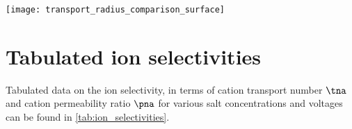 %
\begin{figure*}[t]
  \centering
  \texttt{[image: transport\_radius\_comparison\_surface]}

  \caption[\textit{Lumen} diameters of {ClyA}.]%
  {%
    \textbf{\textit{Lumen} diameters of {ClyA}.}
    Side and top view of the molecular surface of the \gls{clya-as} equilibrated with \gls{md} (left), with
    the crystal ~\cite{Mueller-2009} (middle) and \gls{cryo-em} ~\cite{Peng-2019}
    (right) structures. Surfaces were colored according to $r_{\text{int}}$, the distance of each atom from
    the central axis of the pore, reduced with its van der Waals radius (see~\cref{eq:internal_radius}). The
    traditional diameter of \SI{5.5}{\nm} and the \SI{6.0}{\nm} are outlined in orange and pink respectively.
    Images were rendered using \gls{vmd}~\cite{Humphrey-1996}.
  }\label{fig:transport_radius_comparison_surface}
\end{figure*}

\clearpage

%
\section{Tabulated ion selectivities}
%
\label{sec:transport_appendix:tab_ion_sel}
%

Tabulated data on the ion selectivity, in terms of cation transport number $\tna$ and cation permeability
ratio $\pna$ for various salt concentrations and voltages can be found in \cref{tab:ion_selectivities}.

